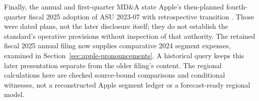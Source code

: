 Finally, the annual and first-quarter MD\&A state Apple's then-planned
fourth-quarter fiscal 2025 adoption of ASU 2023-07 with retrospective
transition \citep[Recent Accounting Pronouncements]{apple2024,apple2025q1}.
Those were dated plans, not the later disclosure itself; they do not
establish the standard's operative provisions without inspection of that
authority. The retained fiscal 2025 annual filing now supplies comparative
2024 segment expenses, examined in Section~\ref{sec:apple-pronouncements}.
A historical query keeps this later presentation separate from the older
filing's content. The regional calculations here are checked source-bound
comparisons and conditional witnesses, not a reconstructed Apple segment
ledger or a forecast-ready regional model.
